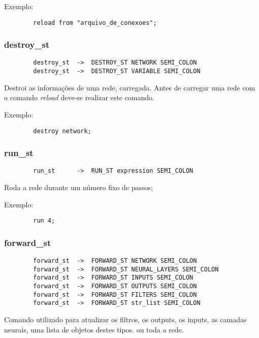 \documentclass[a4paper,10pt]{article}
\begin{document}
		Exemplo:
		\begin{lstlisting}
		reload from "arquivo_de_conexoes";
		\end{lstlisting}
		\vspace{10mm}
	\subsubsection{destroy\_st}
		\begin{lstlisting}
		destroy_st	->	DESTROY_ST NETWORK SEMI_COLON
		destroy_st	->	DESTROY_ST VARIABLE SEMI_COLON
		\end{lstlisting}
		Destroi as informa\c{c}\~oes de uma rede, carregada.
		Antes de carregar uma rede com o comando \emph{reload} deve-se realizar este comando.
		
		Exemplo:
		\begin{lstlisting}
		destroy network;
		\end{lstlisting}
		\vspace{10mm}
	\subsubsection{run\_st}
		\begin{lstlisting}
		run_st		->	RUN_ST expression SEMI_COLON
		\end{lstlisting}
		Roda a rede durante um n\'umero fixo de passos;
		
		Exemplo:
		\begin{lstlisting}
		run 4;
		\end{lstlisting}
		\vspace{10mm}
	\subsubsection{forward\_st}
		\begin{lstlisting}
		forward_st	->	FORWARD_ST NETWORK SEMI_COLON
		forward_st	->	FORWARD_ST NEURAL_LAYERS SEMI_COLON
		forward_st	->	FORWARD_ST INPUTS SEMI_COLON
		forward_st	->	FORWARD_ST OUTPUTS SEMI_COLON
		forward_st	->	FORWARD_ST FILTERS SEMI_COLON
		forward_st	->	FORWARD_ST str_list SEMI_COLON
		\end{lstlisting}
		Comando utilizado para atualizar os filtros, os outputs, os inputs, as camadas neurais, uma lista de objetos destes tipos. ou toda a rede.
		
\end{document}
